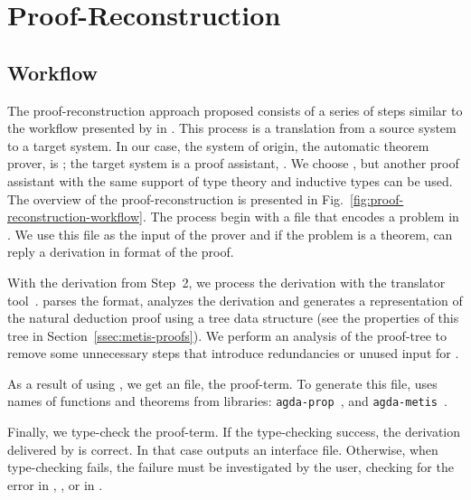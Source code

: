 \documentclass[../main.tex]{subfiles}
\begin{document}

\section{Proof-Reconstruction}
\label{sec:proof-reconstruction}

\subsection{Workflow}
\label{ssec:workflow}



The proof-reconstruction approach proposed consists of a series
of steps similar to the workflow presented by \citeauthor{sultana2015} in
\cite{sultana2015}. This process is a translation from a source
system to a target system. In our case, the system of origin, the
automatic theorem prover, is \Metis; the target system is a proof
assistant, \Agda. We choose \Agda, but another proof assistant with the same support of type theory and inductive types can be used.
The overview of the proof-reconstruction is presented in
Fig.~\ref{fig:proof-reconstruction-workflow}. The process begin with
a \TPTP file that encodes a problem in \CPL. We use this file as the
input of the \Metis prover and if the problem is a theorem, \Metis can reply a derivation in \TSTP format of the proof.

With the \TSTP derivation from Step~2, we process the derivation with the
\Athena translator tool~\cite{Athena}.
\Athena parses the \TSTP format, analyzes the
derivation and generates a representation of the natural deduction
proof using a tree data structure (see the properties
of this tree in Section~\ref{ssec:metis-proofs}).
We perform an analysis of the proof-tree to remove some
unnecessary steps that introduce redundancies or unused input for
\Athena.

As a result of using \Athena, we get an \Agda file, the proof-term. To
generate this file, \Athena uses names of functions and theorems from
\Agda libraries:
\texttt{agda-prop}~\cite{AgdaProp}, and \texttt{agda-metis}~\cite{AgdaMetis}.

Finally, we type-check the \Agda proof-term. If the type-checking
success, the \TSTP derivation delivered by \Metis is correct.
In that case \Agda outputs an interface file.
Otherwise, when type-checking fails, the failure must be
investigated by the user, checking for the error in \Metis, \Athena,
or in \Agda.
\end{document}

